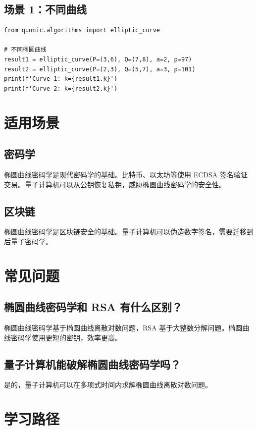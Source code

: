 \documentclass[12pt,a4paper]{article}
\begin{document}
\subsection{场景 1：不同曲线}

\begin{verbatim}
from quonic.algorithms import elliptic_curve

# 不同椭圆曲线
result1 = elliptic_curve(P=(3,6), Q=(7,8), a=2, p=97)
result2 = elliptic_curve(P=(2,3), Q=(5,7), a=3, p=101)
print(f'Curve 1: k={result1.k}')
print(f'Curve 2: k={result2.k}')
\end{verbatim}

\section{适用场景}

\subsection{密码学}

椭圆曲线密码学是现代密码学的基础。比特币、以太坊等使用 ECDSA 签名验证交易。量子计算机可以从公钥恢复私钥，威胁椭圆曲线密码学的安全性。

\subsection{区块链}

椭圆曲线密码学是区块链安全的基础。量子计算机可以伪造数字签名，需要迁移到后量子密码学。

\section{常见问题}

\subsection{椭圆曲线密码学和 RSA 有什么区别？}

椭圆曲线密码学基于椭圆曲线离散对数问题，RSA 基于大整数分解问题。椭圆曲线密码学使用更短的密钥，效率更高。

\subsection{量子计算机能破解椭圆曲线密码学吗？}

是的，量子计算机可以在多项式时间内求解椭圆曲线离散对数问题。

\section{学习路径}
\end{document}
